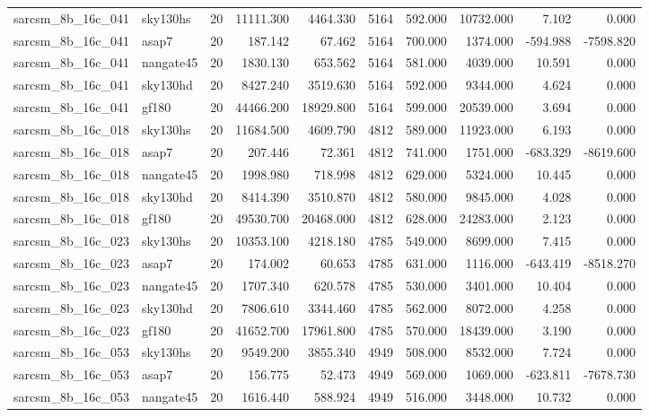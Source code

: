 \begin{longtable}{llrrrrrrrr}
sarcsm\_8b\_16c\_041 & sky130hs & 20 & 11111.300 & 4464.330 & 5164 & 592.000 & 10732.000 & 7.102 & 0.000 \\
sarcsm\_8b\_16c\_041 & asap7 & 20 & 187.142 & 67.462 & 5164 & 700.000 & 1374.000 & -594.988 & -7598.820 \\
sarcsm\_8b\_16c\_041 & nangate45 & 20 & 1830.130 & 653.562 & 5164 & 581.000 & 4039.000 & 10.591 & 0.000 \\
sarcsm\_8b\_16c\_041 & sky130hd & 20 & 8427.240 & 3519.630 & 5164 & 592.000 & 9344.000 & 4.624 & 0.000 \\
sarcsm\_8b\_16c\_041 & gf180 & 20 & 44466.200 & 18929.800 & 5164 & 599.000 & 20539.000 & 3.694 & 0.000 \\
sarcsm\_8b\_16c\_018 & sky130hs & 20 & 11684.500 & 4609.790 & 4812 & 589.000 & 11923.000 & 6.193 & 0.000 \\
sarcsm\_8b\_16c\_018 & asap7 & 20 & 207.446 & 72.361 & 4812 & 741.000 & 1751.000 & -683.329 & -8619.600 \\
sarcsm\_8b\_16c\_018 & nangate45 & 20 & 1998.980 & 718.998 & 4812 & 629.000 & 5324.000 & 10.445 & 0.000 \\
sarcsm\_8b\_16c\_018 & sky130hd & 20 & 8414.390 & 3510.870 & 4812 & 580.000 & 9845.000 & 4.028 & 0.000 \\
sarcsm\_8b\_16c\_018 & gf180 & 20 & 49530.700 & 20468.000 & 4812 & 628.000 & 24283.000 & 2.123 & 0.000 \\
sarcsm\_8b\_16c\_023 & sky130hs & 20 & 10353.100 & 4218.180 & 4785 & 549.000 & 8699.000 & 7.415 & 0.000 \\
sarcsm\_8b\_16c\_023 & asap7 & 20 & 174.002 & 60.653 & 4785 & 631.000 & 1116.000 & -643.419 & -8518.270 \\
sarcsm\_8b\_16c\_023 & nangate45 & 20 & 1707.340 & 620.578 & 4785 & 530.000 & 3401.000 & 10.404 & 0.000 \\
sarcsm\_8b\_16c\_023 & sky130hd & 20 & 7806.610 & 3344.460 & 4785 & 562.000 & 8072.000 & 4.258 & 0.000 \\
sarcsm\_8b\_16c\_023 & gf180 & 20 & 41652.700 & 17961.800 & 4785 & 570.000 & 18439.000 & 3.190 & 0.000 \\
sarcsm\_8b\_16c\_053 & sky130hs & 20 & 9549.200 & 3855.340 & 4949 & 508.000 & 8532.000 & 7.724 & 0.000 \\
sarcsm\_8b\_16c\_053 & asap7 & 20 & 156.775 & 52.473 & 4949 & 569.000 & 1069.000 & -623.811 & -7678.730 \\
sarcsm\_8b\_16c\_053 & nangate45 & 20 & 1616.440 & 588.924 & 4949 & 516.000 & 3448.000 & 10.732 & 0.000 \\

\end{longtable}
